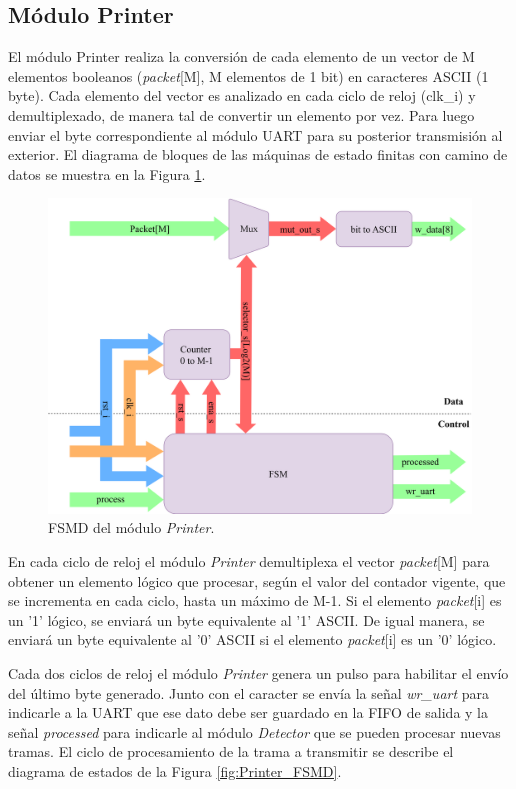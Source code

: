 \subsection{Módulo Printer}
	\label{sec:printer}
	
	El módulo Printer realiza la conversión de cada elemento de un vector de M elementos booleanos (\textit{packet}[M], M elementos de 1 bit) en caracteres ASCII (1 byte). Cada elemento del vector es analizado en cada ciclo de reloj (clk\_i) y demultiplexado, de manera tal de convertir un elemento por vez. Para luego enviar el byte correspondiente al módulo UART para su posterior transmisión al exterior. El diagrama de bloques de las máquinas de estado finitas con camino de datos se muestra en la Figura \ref{fig:Printer_module}.
	
	\begin{figure}[H]
		\centering
		\includegraphics[width=1\textwidth]{Figuras/Printer_module.png}
		\centering\caption{FSMD del módulo \textit{Printer}.}
		\label{fig:Printer_module}
	\end{figure}
	
	En cada ciclo de reloj el módulo \textit{Printer} demultiplexa el vector \textit{packet}[M] para obtener un elemento lógico que procesar, según el valor del contador vigente, que se incrementa en cada ciclo, hasta un máximo de M-1. Si el elemento \textit{packet}[i] es un '1' lógico, se enviará un byte equivalente al '1' ASCII. De igual manera, se enviará un byte equivalente al '0' ASCII si el elemento \textit{packet}[i] es un '0' lógico.
	
	Cada dos ciclos de reloj el módulo \textit{Printer} genera un pulso para habilitar el envío del último byte generado. Junto con el caracter se envía la señal \textit{wr\_uart} para indicarle a la UART que ese dato debe ser guardado en la FIFO de salida y la señal \textit{processed} para indicarle al módulo \textit{Detector} que se pueden procesar nuevas tramas. El ciclo de procesamiento de la trama a transmitir se describe el diagrama de estados de la Figura \ref{fig:Printer_FSMD}.
	
